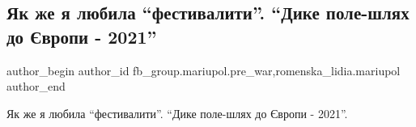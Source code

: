  
 
 
 
 

\subsection{Як же я любила \enquote{фестивалити}. \enquote{Дике поле-шлях до Європи - 2021}}
\label{sec:12_02_2023.fb.fb_group.mariupol.pre_war.8.yak_zhe_ya_lyubila__}
 
\ifcmt
 author_begin
   author_id fb_group.mariupol.pre_war,romenska_lidia.mariupol
 author_end
\fi

Як же я любила \enquote{фестивалити}. \enquote{Дике поле-шлях до Європи - 2021}.

